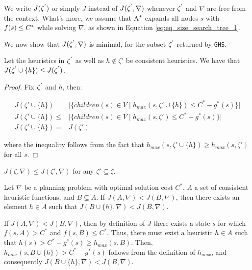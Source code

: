 We write $J(\zeta\sp{'})$ or simply $J$ instead of $J(\zeta\sp{'},\nabla)$ whenever $\zeta\sp{'}$ and $\nabla$ are free from the context. What's more, we assume that A$\sp{*}$ expands all nodes $s$ with $f(s) \leq C\sp{*}$ while solving $\nabla$, as shown in Equation \ref{eq:eq_size_search_tree_1}.

\iffalse
We now show that $J(\zeta\sp{'}, \nabla)$ is minimal, for the subset $\zeta\sp{'}$ returned by \texttt{GHS}.
\begin{theorem}
Let the heuristics in $\zeta\sp{'}$ as well as $h \notin \zeta'$ be consistent heuristics. We have that
$J(\zeta\sp{'} \cup \{h\}) \le J(\zeta\sp{'})$.\\
\label{lemma:monotonic}
\end{theorem}
\begin{proof}
Fix $\zeta\sp{'}$ and $h$, then: 
\begin{small}
\begin{align*}
J(\zeta' \cup \{h\})  =&\big| \big\{children(s)  \in V \mid h_{max}(s, \zeta'\cup \{h\}) \le C^* -g^*(s)\big\} \big|\\
J(\zeta' \cup \{h\})  \le&\big| \big\{children(s)  \in V \mid h_{max}(s, \zeta') \le C^* -g^*(s)\big\} \big|\\
J(\zeta' \cup \{h\})  =&J(\zeta')\
\end{align*} 
\end{small}
where the inequality follows from the fact that $h_{max}(s, \zeta'\cup \{h\})\ge h_{max}(s, \zeta')$ for all $s$.
\end{proof}

\begin{corollary}
$J(\zeta, \nabla) \leq J(\zeta', \nabla)$ for any $\zeta' \subseteq \zeta$.
\label{eq:max_optimal}
\end{corollary}

\begin{lemma}
Let $\nabla$ be a planning problem with optimal solution cost $C^*$, $A$  a set of consistent heuristic functions, and $B \subseteq A$. If $J(A, \nabla) < J(B, \nabla)$, then there exists an element $h \in A$ such that $J(B \cup \{h\}, \nabla) < J(B, \nabla)$.
\label{lemma:prop}
\end{lemma}

If $J(A, \nabla) < J(B, \nabla)$, then by definition of $J$ there exists a state $s$ for which $f(s, A) > C^*$ and $f(s, B) \le C^*$. Thus, there must exist a heuristic $h \in A$ such that $h(s) > C^* - g^*(s) \ge h_{max}(s, B)$. Then, $h_{max}(s, B \cup \{h\}) > C^* - g^*(s)$ follows from the definition of $h_{max}$, and consequently $J(B \cup \{h\}, \nabla) < J(B, \nabla)$.

